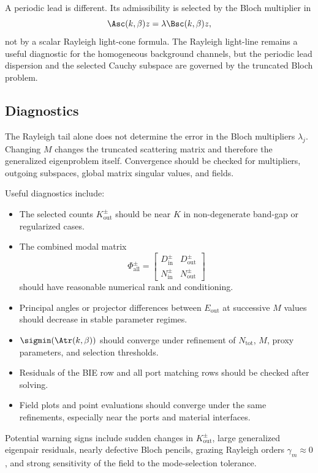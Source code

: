 A periodic lead is different.  Its admissibility is selected by the Bloch
multiplier in
\[
  \Asc(k,\beta)z=\lambda\Bsc(k,\beta)z,
\]
not by a scalar Rayleigh light-cone formula.  The Rayleigh light-line remains a
useful diagnostic for the homogeneous background channels, but the periodic
lead dispersion and the selected Cauchy subspace are governed by the truncated
Bloch problem.

\subsection{Diagnostics}

The Rayleigh tail alone does not determine the error in the Bloch multipliers
\(\lambda_j\).  Changing \(M\) changes the truncated scattering matrix and
therefore the generalized eigenproblem itself.  Convergence should be checked
for multipliers, outgoing subspaces, global matrix singular values, and fields.

Useful diagnostics include:
\begin{itemize}
  \item The selected counts \(K_{\mathrm{out}}^\pm\) should be near \(K\) in
  non-degenerate band-gap or regularized cases.
  \item The combined modal matrix
  \[
    \Phi_{\mathrm{all}}^\pm
    =
    \begin{bmatrix}
    D_{\mathrm{in}}^\pm & D_{\mathrm{out}}^\pm\\
    N_{\mathrm{in}}^\pm & N_{\mathrm{out}}^\pm
    \end{bmatrix}
  \]
  should have reasonable numerical rank and conditioning.
  \item Principal angles or projector differences between \(E_{\mathrm{out}}\)
  at successive \(M\) values should decrease in stable parameter regimes.
  \item \(\sigmin(\Atr(k,\beta))\) should converge under refinement of
  \(N_{\mathrm{tot}}\), \(M\), proxy parameters, and selection thresholds.
  \item Residuals of the BIE row and all port matching rows should be checked
  after solving.
  \item Field plots and point evaluations should converge under the same
  refinements, especially near the ports and material interfaces.
\end{itemize}

Potential warning signs include sudden changes in \(K_{\mathrm{out}}^\pm\),
large generalized eigenpair residuals, nearly defective Bloch pencils, grazing
Rayleigh orders \(\gamma_m\approx0\), and strong sensitivity of the field to the
mode-selection tolerance.
